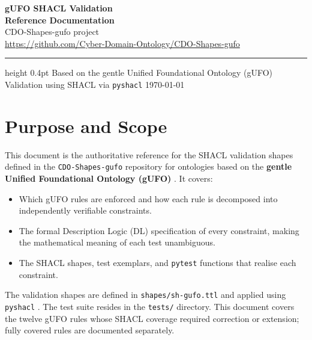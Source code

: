 \documentclass[12pt,a4paper]{article}
\begin{document}
\begin{titlepage}
  \centering
  \vspace*{3cm}
  {\Huge\bfseries\color{ruleblue} gUFO SHACL Validation\\[0.4em]
   Reference Documentation}\\[2em]
  {\large CDO-Shapes-gufo project}\\[1em]
  {\large\url{https://github.com/Cyber-Domain-Ontology/CDO-Shapes-gufo}}\\[3em]
  \hrule height 0.4pt
  \vspace{1em}
  {\normalsize
    Based on the gentle Unified Foundational Ontology (gUFO)\\
    Validation using SHACL via \texttt{pyshacl}
  }
  \vfill
  {\small\today}
\end{titlepage}

\tableofcontents
\newpage

\section{Purpose and Scope}

This document is the authoritative reference for the SHACL validation shapes
defined in the \texttt{CDO-Shapes-gufo} repository for ontologies based on the
\textbf{gentle Unified Foundational Ontology (gUFO)} \citep{gufo2022}.
It covers:

\begin{itemize}
  \item Which gUFO rules are enforced and how each rule is decomposed into
        independently verifiable constraints.
  \item The formal Description Logic (DL) specification of every constraint,
        making the mathematical meaning of each test unambiguous.
  \item The SHACL shapes, test exemplars, and \texttt{pytest} functions that
        realise each constraint.
\end{itemize}

The validation shapes are defined in \texttt{shapes/sh-gufo.ttl} and applied
using \texttt{pyshacl} \citep{pyshacl}. The test suite resides in the
\texttt{tests/} directory. This document covers the twelve gUFO rules whose
SHACL coverage required correction or extension; fully covered rules are
documented separately.
\end{document}
